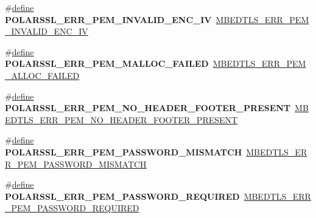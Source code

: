 \begin{DoxyCompactItemize}
\item 
\mbox{\label{compat-1_83_8h_aee09ae2e237315b0fa0ad7071f07abcf}} 
\#\hyperlink{structdefine}{define} {\bfseries P\+O\+L\+A\+R\+S\+S\+L\+\_\+\+E\+R\+R\+\_\+\+P\+E\+M\+\_\+\+I\+N\+V\+A\+L\+I\+D\+\_\+\+E\+N\+C\+\_\+\+IV}~\hyperlink{pem_8h_a7709c4b0616a4d6ec0184204ace4d4b3}{M\+B\+E\+D\+T\+L\+S\+\_\+\+E\+R\+R\+\_\+\+P\+E\+M\+\_\+\+I\+N\+V\+A\+L\+I\+D\+\_\+\+E\+N\+C\+\_\+\+IV}
\item 
\mbox{\label{compat-1_83_8h_aa5881696f05e65e7aa94883c933917f5}} 
\#\hyperlink{structdefine}{define} {\bfseries P\+O\+L\+A\+R\+S\+S\+L\+\_\+\+E\+R\+R\+\_\+\+P\+E\+M\+\_\+\+M\+A\+L\+L\+O\+C\+\_\+\+F\+A\+I\+L\+ED}~\hyperlink{pem_8h_a97ca9753a0adeb688b3093506c60a41e}{M\+B\+E\+D\+T\+L\+S\+\_\+\+E\+R\+R\+\_\+\+P\+E\+M\+\_\+\+A\+L\+L\+O\+C\+\_\+\+F\+A\+I\+L\+ED}
\item 
\mbox{\label{compat-1_83_8h_aba55809b3ae6781d4ab92ccdfbe54a9c}} 
\#\hyperlink{structdefine}{define} {\bfseries P\+O\+L\+A\+R\+S\+S\+L\+\_\+\+E\+R\+R\+\_\+\+P\+E\+M\+\_\+\+N\+O\+\_\+\+H\+E\+A\+D\+E\+R\+\_\+\+F\+O\+O\+T\+E\+R\+\_\+\+P\+R\+E\+S\+E\+NT}~\hyperlink{pem_8h_a9fca39bb5d4a6845239221a53685a2dc}{M\+B\+E\+D\+T\+L\+S\+\_\+\+E\+R\+R\+\_\+\+P\+E\+M\+\_\+\+N\+O\+\_\+\+H\+E\+A\+D\+E\+R\+\_\+\+F\+O\+O\+T\+E\+R\+\_\+\+P\+R\+E\+S\+E\+NT}
\item 
\mbox{\label{compat-1_83_8h_aa950405345e1ae27eb5f7c91f3be1f04}} 
\#\hyperlink{structdefine}{define} {\bfseries P\+O\+L\+A\+R\+S\+S\+L\+\_\+\+E\+R\+R\+\_\+\+P\+E\+M\+\_\+\+P\+A\+S\+S\+W\+O\+R\+D\+\_\+\+M\+I\+S\+M\+A\+T\+CH}~\hyperlink{pem_8h_aea98f44a528310c53398a49c90469861}{M\+B\+E\+D\+T\+L\+S\+\_\+\+E\+R\+R\+\_\+\+P\+E\+M\+\_\+\+P\+A\+S\+S\+W\+O\+R\+D\+\_\+\+M\+I\+S\+M\+A\+T\+CH}
\item 
\mbox{\label{compat-1_83_8h_afc5d820a2b2e902f0761de2172cc3ad4}} 
\#\hyperlink{structdefine}{define} {\bfseries P\+O\+L\+A\+R\+S\+S\+L\+\_\+\+E\+R\+R\+\_\+\+P\+E\+M\+\_\+\+P\+A\+S\+S\+W\+O\+R\+D\+\_\+\+R\+E\+Q\+U\+I\+R\+ED}~\hyperlink{pem_8h_ab883990c7b4a373519ab3b25ec945cd8}{M\+B\+E\+D\+T\+L\+S\+\_\+\+E\+R\+R\+\_\+\+P\+E\+M\+\_\+\+P\+A\+S\+S\+W\+O\+R\+D\+\_\+\+R\+E\+Q\+U\+I\+R\+ED}
\item 
\mbox{\label{compat-1_83_8h_a8094fdb48782e6b5ffeebc8912f94597}} 

\end{DoxyCompactItemize}
